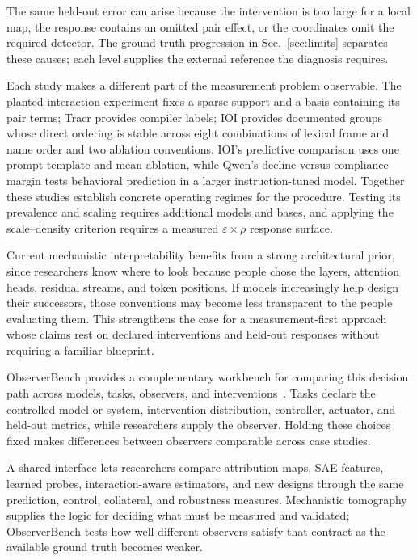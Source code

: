 \documentclass[sigconf,10pt,nonacm,balance=false]{acmart}
\newcommand{\eps}{\varepsilon}
\begin{document}
The same held-out error can arise because the intervention is too large for a local map, the response contains an omitted pair effect, or the coordinates omit the required detector. The ground-truth progression in Sec.~\ref{sec:limits} separates these causes; each level supplies the external reference the diagnosis requires.

Each study makes a different part of the measurement problem observable. The planted interaction experiment fixes a sparse support and a basis containing its pair terms; Tracr provides compiler labels; IOI provides documented groups whose direct ordering is stable across eight combinations of lexical frame and name order and two ablation conventions. IOI's predictive comparison uses one prompt template and mean ablation, while Qwen's decline-versus-compliance margin tests behavioral prediction in a larger instruction-tuned model. Together these studies establish concrete operating regimes for the procedure. Testing its prevalence and scaling requires additional models and bases, and applying the scale--density criterion requires a measured $\eps\times\rho$ response surface.

Current mechanistic interpretability benefits from a strong architectural prior, since researchers know where to look because people chose the layers, attention heads, residual streams, and token positions. If models increasingly help design their successors, those conventions may become less transparent to the people evaluating them. This strengthens the case for a measurement-first approach whose claims rest on declared interventions and held-out responses without requiring a familiar blueprint.

ObserverBench provides a complementary workbench for comparing this decision path across models, tasks, observers, and interventions~\cite{erramilli2026observerbench}. Tasks declare the controlled model or system, intervention distribution, controller, actuator, and held-out metrics, while researchers supply the observer. Holding these choices fixed makes differences between observers comparable across case studies.

A shared interface lets researchers compare attribution maps, SAE features, learned probes, interaction-aware estimators, and new designs through the same prediction, control, collateral, and robustness measures. Mechanistic tomography supplies the logic for deciding what must be measured and validated; ObserverBench tests how well different observers satisfy that contract as the available ground truth becomes weaker.
\end{document}
